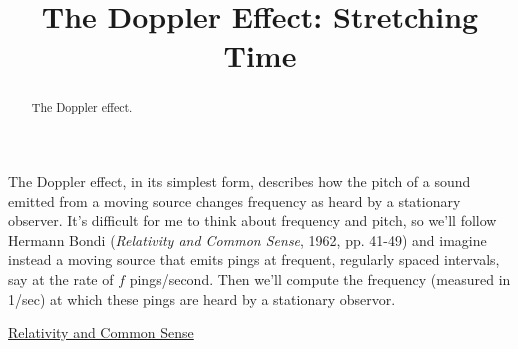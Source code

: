 \documentclass{ximera}
\title{The Doppler Effect: Stretching Time}
\begin{document}
\begin{abstract}
The Doppler effect.
\end{abstract}
\maketitle

The Doppler effect, in its simplest form, describes how the pitch of a sound emitted from a moving source changes frequency as heard by a stationary observer. It's difficult for me to think about frequency and pitch, so we'll follow Hermann Bondi (\emph{Relativity and Common Sense}, 1962, pp. 41-49) and imagine instead a moving source that emits pings at frequent, regularly spaced intervals, say at the rate of $f$ pings/second. Then we'll compute the frequency (measured in 1/sec) at which these pings are heard by a stationary observor.

\href{https://ia801502.us.archive.org/15/items/in.ernet.dli.2015.62059/2015.62059.Relativity-And-Common-Sense.pdf}{Relativity and Common Sense}
\end{document}
